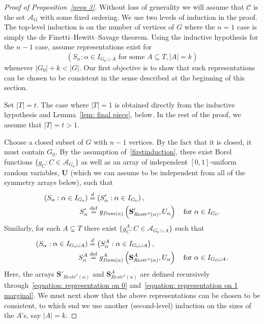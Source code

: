 \documentclass[AHL,Unicode,longabstracts,published]{cedram}
\newcommand{\alf}{\alpha}%
\newcommand*{\defeq}{\stackrel{\mathrm{def}}{=}}
\renewcommand{\d}{\buildrel{d}\over{=}}
\newcommand*\srstr{\mathit{Restr}^o}
\newcommand*\dom{\mathit{Dom}}
\renewcommand{\AA}{\mathcal{A}}
\newcommand*\CC{{\mathcal{C}}}
\newcommand*\bS{\mathbf{S}}
\newcommand*\bU{\mathbf{U}}
\begin{document}
\begin{proof}[Proof of Proposition~\ref{prop 3}]
Without loss of generality we will assume that $\CC$ is the set $\AA_G$ with some fixed ordering. We use two levels of induction in the proof. The top-level induction is on the number of vertices of $G$ where the $n=1$ case is simply the de Finetti--Hewitt--Savage theorem. Using the inductive hypothesis for the $n-1$ case, assume representations exist for
\begin{equation}\label{firstinduction}
(S_\alpha : \alpha \in I_{G_0 \cup A} \text{ for some } A \subseteq T, |A|=k)
\end{equation}
whenever $|G_0|+k<|G|$. Our first objective is to show that such representations can be chosen to be consistent in the sense described at the beginning of this section.

Set $|T|=t$. The case where $|T|=1$ is obtained directly from the inductive hypothesis and Lemma~\ref{lem: final piece}, below. In the rest of the proof, we assume that $|T| = t >1$.

Choose a closed subset of $G$ with $n-1$ vertices. By the fact that it is closed, it must contain $G_0$. By the assumption of~\eqref{firstinduction}, there exist Borel functions $\{g_C: C \in \AA_{G_0}\}$ as well as an array of independent $[0,1]$-uniform random variables, $\bU$ (which we can assume to be independent from all of the symmetry arrays below), such that
\begin{equation}\label{equation: representation on 0}
\begin{aligned}
(S_\alf : \alf \in I_{G_0}) & \d \left(S'_\alf : \alf \in I_{G_0}\right),
\\
S'_\alf &
\defeq g_{\dom(\alf)}\left(\bS'_{\srstr(\alf)}, U_\alf\right)\quad \text{for } \alf \in I_{G_0}.
\end{aligned}
\end{equation}
Similarly, for each $A\subsetneq T$ there exist $\{g^A_C: C \in \AA_{G_0 \cup A}\}$ such that
\begin{equation}\label{equation: representation on 1 marginal}
\begin{aligned}
(S_\alf : \alf \in I_{G_0 \cup A}) & \d \left(S^A_\alf : \alf \in I_{G_0 \cup A}\right),
\\
S^A_\alf &
\defeq g^A_{\dom(\alf)}\left(\bS^A_{\srstr(\alf)}, U_\alf\right) \quad\text{for } \alf \in I_{G_0 \cup A}.
\end{aligned}
\end{equation}
Here, the arrays $\bS'_{\srstr(\alf)}$ and $\bS^A_{\srstr(\alf)}$ are defined recursively through~\eqref{equation: representation on 0} and~\eqref{equation: representation on 1 marginal}. We must next show that the above representations can be chosen to be consistent, to which end we use another (second-level) induction on the sizes of the $A$'s, say $|A|=k$.


\end{proof}
\end{document}
